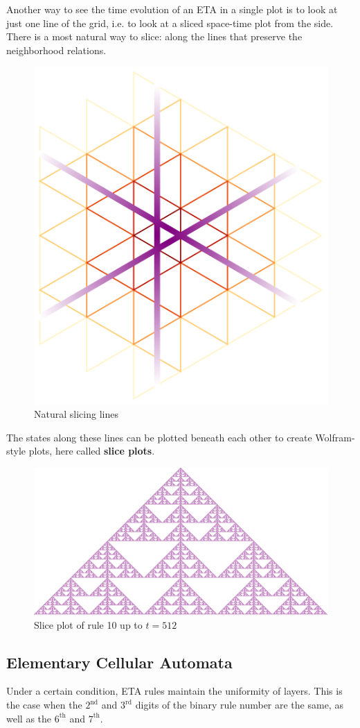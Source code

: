 \documentclass{article}
\begin{document}
\pagebreak
Another way to see the time evolution of an ETA in a single plot is to look at just one line of the grid, i.e. to look at a sliced space-time plot from the side. There is a most natural way to slice: along the lines that preserve the neighborhood relations.

\begin{figure}[H]
    \centering
    \includegraphics[width=.5\textwidth]{graphics/behavior/space-time/slice-lines.png}
    \caption{Natural slicing lines}
    \label{fig:slice-lines}
\end{figure}

The states along these lines can be plotted beneath each other to create Wolfram-style plots, here called \textbf{slice plots}.  

\begin{figure}[H]
    \centering
    \includegraphics[width=\textwidth]{graphics/behavior/space-time/rule-10-slice-plot-512.pdf}
    \caption{Slice plot of rule 10 up to $t=512$}
    \label{fig:rule-10-slice-plot-512}
\end{figure}

\pagebreak
\subsection{Elementary Cellular Automata} \label{elementary-cellular-automata}
Under a certain condition, ETA rules maintain the uniformity of layers. This is the case when the $2^\text{nd}$ and $3^\text{rd}$ digits of the binary rule number are the same, as well as the $6^\text{th}$ and $7^\text{th}$.
\end{document}
